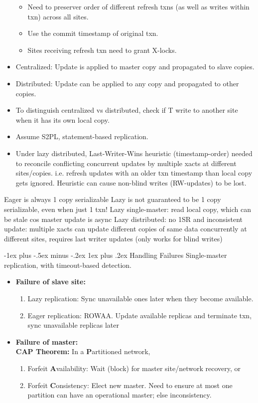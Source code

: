 \documentclass[8pt, landscape]{extarticle}
\makeatletter
\renewcommand{\subsubsection}{\@startsection{subsubsection}{3}{0mm}%
  {-1ex plus -.5ex minus -.2ex}%
  {1ex plus .2ex}%
{\normalfont\small\bfseries}}%
\makeatother
\begin{document}
\begin{multicols*}{4}
\begin{itemize}
\begin{itemize}
        \item Need to preserver order of different refresh txns (as well as writes within txn) across all sites.
        \item Use the commit timestamp of original txn.
        \item Sites receiving refresh txn need to grant X-locks.
    \end{itemize}
    \item Centralized: Update is applied to master copy and propagated to slave copies.
    \item Distributed: Update can be applied to any copy and propagated to other copies.
    \item To distinguish centralized vs distributed, check if T write to another site when it has its own local copy.
    \item Assume S2PL, statement-based replication.
    \item Under lazy distributed, Last-Writer-Wins heuristic (timestamp-order) needed to reconcile conflicting concurrent updates by multiple xacts at different sites/copies. i.e. refresh updates with an older txn timestamp than local copy gets ignored. Heuristic can cause non-blind writes (RW-updates) to be lost.
\end{itemize}

Eager is always 1 copy serializable
Lazy is not guaranteed to be 1 copy serializable, even when just 1 txn!
Lazy single-master: read local copy, which can be stale cos master update is async
Lazy distributed: no 1SR and inconsistent update: multiple xacts can update different copies of same data concurrently at different sites, requires last writer updates (only works for blind writes)

\subsubsection{Handling Failures}
Single-master replication, with timeout-based detection.
\begin{itemize}
    \item \textbf{Failure of slave site:}
    \begin{enumerate}
        \item Lazy replication: Sync unavailable ones later when they become available.
        \item Eager replication: ROWAA. Update available replicas and terminate txn, sync unavailable replicas later
    \end{enumerate}
    \item \textbf{Failure of master:} \\
    \textbf{CAP Theorem:} In a \textbf{P}artitioned network,
    \begin{enumerate}
        \item Forfeit \textbf{A}vailability: Wait (block) for master site/network recovery, or
        \item Forfeit \textbf{C}onsistency: Elect new master. Need to ensure at most one partition can have an operational master; else inconsistency.
    \end{enumerate}
\end{itemize}


\end{multicols*}
\end{document}
